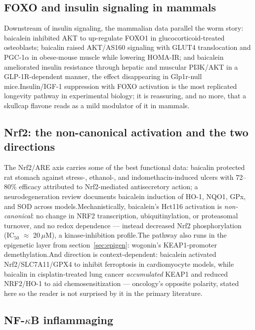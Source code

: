 \documentclass[11pt]{article}
\newcommand{\src}[1]{\allowbreak[#1]}
\begin{document}
\subsection{FOXO and insulin signaling in mammals}

Downstream of insulin signaling, the mammalian data parallel the worm story: baicalein inhibited AKT to up-regulate FOXO1 in glucocorticoid-treated osteoblasts; baicalin raised AKT/AS160 signaling with GLUT4 translocation and PGC-1$\alpha$ in obese-mouse muscle while lowering HOMA-IR; and baicalein ameliorated insulin resistance through hepatic and muscular PI3K/AKT in a GLP-1R-dependent manner, the effect disappearing in Glp1r-null mice.\src{170}\src{180}\src{175} Insulin/IGF-1 suppression with FOXO activation is the most replicated longevity pathway in experimental biology; it is reassuring, and no more, that a skullcap flavone reads as a mild modulator of it in mammals.\src{167}\src{175}

\subsection{Nrf2: the non-canonical activation and the two directions}

The Nrf2/ARE axis carries some of the best functional data: baicalin protected rat stomach against stress-, ethanol-, and indomethacin-induced ulcers with 72--80\% efficacy attributed to Nrf2-mediated antisecretory action; a neurodegeneration review documents baicalein induction of HO-1, NQO1, GPx, and SOD across models.\src{190}\src{174} Mechanistically, baicalein's Hct116 activation is \emph{non-canonical}: no change in NRF2 transcription, ubiquitinylation, or proteasomal turnover, and no redox dependence --- instead decreased Nrf2 phosphorylation (IC$_{50}$ $\approx$ 20\,$\mu$M), a kinase-inhibition profile.\src{116} The pathway also runs in the epigenetic layer from section~\ref{sec:epigen}: wogonin's KEAP1-promoter demethylation.\src{145} And direction is context-dependent: baicalein activated Nrf2/SLC7A11/GPX4 to inhibit ferroptosis in cardiomyocyte models, while baicalin in cisplatin-treated lung cancer \emph{accumulated} KEAP1 and reduced NRF2/HO-1 to aid chemosensitization --- oncology's opposite polarity, stated here so the reader is not surprised by it in the primary literature.\src{161}\src{149}

\subsection{NF-$\kappa$B inflammaging}
\end{document}
